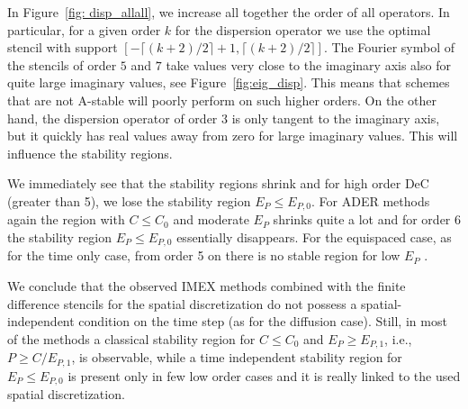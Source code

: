 In Figure~\ref{fig: disp_allall}, we increase all together the order of all operators.
In particular, for a given order $k$ for the dispersion operator we use the optimal stencil with support $[-\lceil (k+2)/2 \rceil +1 ,\lceil (k+2)/2\rceil]$. 
The Fourier symbol of the stencils of order $5$ and $7$ take values very close to the imaginary axis also for quite large imaginary values, see Figure~\ref{fig:eig_disp}. This means that schemes that are not A-stable will poorly perform on such higher orders. On the other hand, the dispersion operator of order 3 is only tangent to the imaginary axis, but it quickly has real values away from zero for large imaginary values. This will influence the stability regions.

We immediately see that the stability regions shrink and for high order DeC (greater than 5), we lose the stability region $E_P\leq E_{P,0}$. For ADER methods again the region with $C\leq C_0$ and moderate $E_P$ shrinks quite a lot and for order 6 the stability region $E_P\leq E_{P,0}$ essentially disappears. For the equispaced case, as for the time only case, from order 5 on there is no stable region for low $E_P$ \cite{ourrepo}.

We conclude that the observed IMEX methods combined with the finite difference stencils for the spatial discretization do not possess a spatial-independent condition on the time step (as for the diffusion case). 
Still, in most of the methods a classical stability region for $C\leq C_0$ and $E_P\geq E_{P,1}$, i.e., $P\geq C/E_{P,1}$, is observable, while a time independent stability region for $E_P\leq E_{P,0}$ is present only in few low order cases and it is really linked to the used spatial discretization. 
